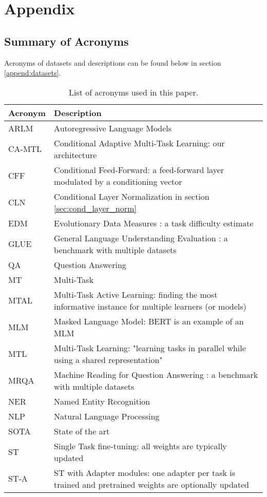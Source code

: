 \documentclass{article} \usepackage{iclr2021_conference,times}
\begin{document}



\clearpage

\appendix

\section{Appendix}

\subsection{Summary of Acronyms}
\label{append:acronyms}

Acronyms of datasets and descriptions can be found below in section \ref{append:datasets}.

\begin{table}[ht]
\caption{\small List of acronyms used in this paper.}
\begin{center}
\scriptsize
\begin{tabular}{|l|l|}
	\hline 
		\textbf{Acronym}   & \textbf{Description} \\
		\hline
		ARLM      & Autoregressive Language Models \\
		CA-MTL    & Conditional Adaptive Multi-Task Learning: our architecture \\
		CFF       & Conditional Feed-Forward: a feed-forward layer modulated by a conditioning vector \\
		CLN       & Conditional Layer Normalization in section \ref{sec:cond_layer_norm} \\
		EDM       & Evolutionary  Data  Measures \citep{collins-etal-2018-evolutionary}: a task difficulty estimate \\
		GLUE      & General Language Understanding Evaluation \cite{wang-etal-2018-glue}: a benchmark with multiple datasets \\
		QA        & Question Answering \\
		MT        & Multi-Task \\
		MTAL      & Multi-Task Active Learning: finding the most informative instance for multiple learners (or models) \\
		MLM       & Masked Language Model: BERT \cite{bert} is an example of an MLM \\
		MTL       & Multi-Task Learning: "learning tasks in parallel while using a shared representation" \citep{mtl_caruana1997} \\
		MRQA      & Machine Reading for Question Answering \cite{fisch2019mrqa}: a benchmark 
		with multiple datasets  \\
		NER       & Named Entity Recognition \\
		NLP       & Natural Language Processing \\
		SOTA      & State of the art \\
		ST        & Single Task fine-tuning: all weights are typically updated  \\
		ST-A      & ST with Adapter modules: one adapter per task is trained and pretrained weights are optionally updated \\
		

\end{tabular}
\end{center}
\end{table}
\end{document}
